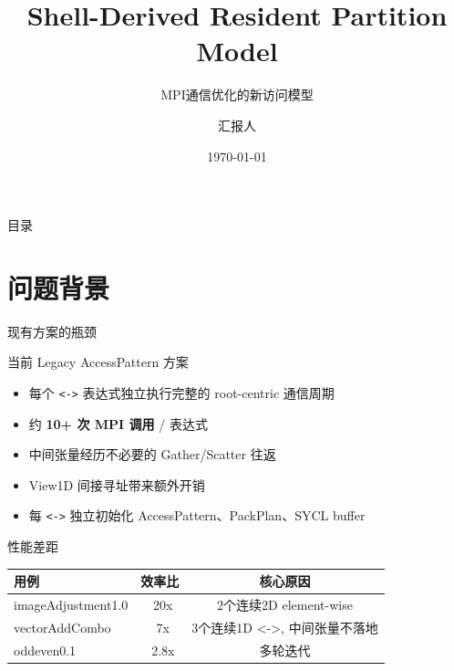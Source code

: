 \documentclass[aspectratio=169,10pt]{beamer}
\title{Shell-Derived Resident Partition Model}
\subtitle{MPI通信优化的新访问模型}
\author{汇报人}
\institute{}
\date{\today}
\begin{document}
\begin{frame}
\titlepage
\end{frame}

\begin{frame}{目录}
\tableofcontents
\end{frame}

\section{问题背景}
\begin{frame}{现有方案的瓶颈}
\begin{block}{当前 Legacy AccessPattern 方案}
\begin{itemize}
    \item 每个 \texttt{<->} 表达式独立执行完整的 root-centric 通信周期
    \item 约 \textbf{10+ 次 MPI 调用} / 表达式
    \item 中间张量经历不必要的 Gather/Scatter 往返
    \item View1D 间接寻址带来额外开销
    \item 每 \texttt{<->} 独立初始化 AccessPattern、PackPlan、SYCL buffer
\end{itemize}
\end{block}

\bigskip
\begin{alertblock}{性能差距}
\begin{tabular}{lcc}
    \toprule
    用例 & 效率比 & 核心原因 \\
    \midrule
    imageAdjustment1.0 & ~20x & 2个连续2D element-wise \\
    vectorAddCombo & ~7x & 3个连续1D <->, 中间张量不落地 \\
    oddeven0.1 & ~2.8x & 多轮迭代 \\
    \bottomrule
\end{tabular}
\end{alertblock}
\end{frame}
\end{document}
